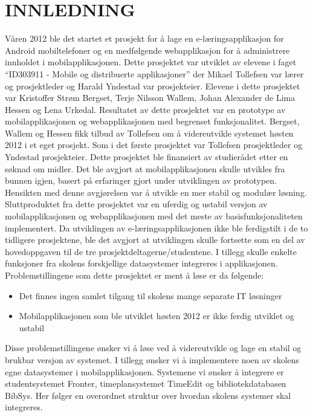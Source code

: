 \documentclass[../main.tex]{subfiles}
\begin{document}
\chapter{INNLEDNING}

Våren 2012 ble det startet et prosjekt for å lage en e-læringsapplikasjon for Android mobiltelefoner og en medfølgende webapplikasjon for å administrere innholdet i mobilapplikasjonen. Dette prosjektet var utviklet av elevene i faget “ID303911 - Mobile og distribuerte applikasjoner” der Mikael Tollefsen var lærer og prosjektleder og Harald Yndestad var prosjekteier. Elevene i dette prosjektet var Kristoffer Strøm Bergset, Terje Nilsson Wallem, Johan Alexander de Lima Hessen og Lena Urkedal. Resultatet av dette prosjektet var en prototype av mobilapplikasjonen og webapplikasjonen med begrenset funksjonalitet.\newline
\newline
Bergset, Wallem og Hessen fikk tilbud av Tollefsen om å videreutvikle systemet høsten 2012 i et eget prosjekt. Som i det første prosjektet var Tollefsen prosjektleder og Yndestad prosjekteier. Dette prosjektet ble finansiert av studierådet etter en søknad om midler. Det ble avgjort at mobilapplikasjonen skulle utvikles fra bunnen igjen, basert på erfaringer gjort under utviklingen av prototypen. Hensikten med denne avgjørelsen var å utvikle en mer stabil og modulær løsning. Sluttproduktet fra dette prosjektet var en uferdig og ustabil versjon av mobilapplikasjonen og webapplikasjonen med det meste av basisfunksjonaliteten implementert.\newline
\newline
Da utviklingen av e-læringsapplikasjonen ikke ble ferdigstilt i de to tidligere prosjektene, ble det avgjort at utviklingen skulle fortsette som en del av hovedoppgaven til de tre prosjektdeltagerne/studentene. I tillegg skulle enkelte funksjoner fra skolens forskjellige datasystemer integreres i applikasjonen.\newline
Problemstillingene som dette prosjektet er ment å løse er da følgende:
\begin{itemize}
\item Det finnes ingen samlet tilgang til skolens mange separate IT løsninger
\item Mobilapplikasjonen som ble utviklet høsten 2012 er ikke ferdig utviklet og ustabil
\end{itemize}
Disse problemstillingene ønsker vi å løse ved å videreutvikle og lage en stabil og brukbar versjon av systemet. I tillegg ønsker vi å implementere noen av skolens egne datasystemer i mobilapplikasjonen. Systemene vi ønsker å integrere er studentsystemet Fronter, timeplansystemet TimeEdit og bibliotekdatabasen BibSys. Her følger en overordnet struktur over hvordan skolens systemer skal integreres.
\end{document}
